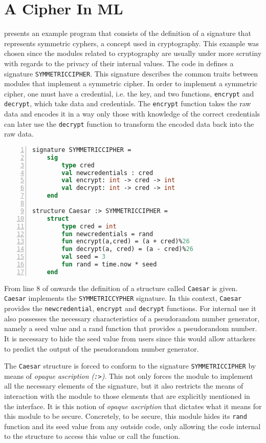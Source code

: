 \section{A Cipher In ML}
\label{sec:MLExample}
 presents an example program that consists of the definition of a signature that represents symmetric cyphers, a concept used in cryptography.
This example was chosen since the modules related to cryptography are usually under more scrutiny with regards to the privacy of their internal values.
The code in  defines a signature \texttt{SYMMETRICCIPHER}.
This signature describes the common traits between modules that implement a symmetric cipher.
In order to implement a symmetric cipher, one must have a credential, i.e. the key, and two functions, \texttt{encrypt} and \texttt{decrypt}, which take data and credentials.
The \texttt{encrypt} function takes the raw data and encodes it in a way only those with knowledge of the correct credentials can later use the \texttt{decrypt} function to transform the encoded data back into the raw data.

\begin{lstlisting}[frame=single, language=ML,numbers=left, label=code:Example, caption=Example of a security sensitive module specifying and implementing a symmetric cypher.]
signature SYMMETRICCIPHER =
    sig 
        type cred
        val newcredentials : cred
        val encrypt: int -> cred -> int
        val decrypt: int -> cred -> int
    end

structure Caesar :> SYMMETRICCIPHER =
    struct
        type cred = int
        fun newcredentials = rand
        fun encrypt(a,cred) = (a + cred)%26
        fun decrypt(a, cred) = (a - cred)%26
        val seed = 3
        fun rand = time.now * seed
    end
\end{lstlisting}

From line 8 of  onwards the definition of a structure called \texttt{Caesar} is given.
\texttt{Caesar} implements the \texttt{SYMMETRICCYPHER} signature.
In this context, \texttt{Caesar} provides the \texttt{newcredential}, \texttt{encrypt} and \texttt{decrypt} functions.
For internal use it also possesses the necessary characteristics of a pseudorandom number generator, namely a seed value and a rand function that provides a pseudorandom number.
It is necessary to hide the seed value from users since this would allow attackers to predict the output of the pseudorandom number generator.

The \texttt{Caesar} structure is forced to conform to the signature \texttt{SYMMETRICCIPHER} by means of \emph{opaque ascription (\texttt{:>})}.
This not only forces the module to implement all the necessary elements of the signature, but it also restricts the means of interaction with the module to those elements that are explicitly mentioned in the interface.
It is this notion of \emph{opaque ascription} that dictates what it means for this module to be secure.
Concretely, to be secure, this module hides its \texttt{rand} function and its seed value from any outside code, only allowing the code internal to the structure to access this value or call the function.

